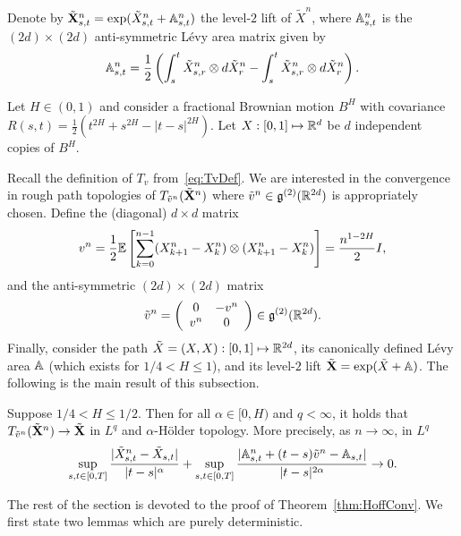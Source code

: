 \documentclass{article}
\begin{document}
Denote by $\tilde {\mathbf X}^n_{s,t} = \exp(\tilde X^n_{s,t} + \mathbb A^n_{s,t})$ the level-$2$ lift of $\tilde X^n$, where $\mathbb A^n_{s,t}$ is the $(2d) \times (2d)$ anti-symmetric L{\'e}vy area matrix given by
\[
\mathbb A^n_{s,t}
= \frac{1}{2}\left(\int_s^t \tilde X^n_{s,r} \otimes d\tilde X^n_r - \int_s^t \tilde X^n_{s,r} \otimes d\tilde X^n_r\right).
\]


Let $H \in (0,1)$ and consider a fractional Brownian motion $B^H$ with covariance $R(s,t) = \frac{1}{2}(t^{2H} + s^{2H} - |t-s|^{2H})$. Let $X : [0,1] \mapsto \mathbb R^d$ be $d$ independent copies of $B^H$.

Recall the definition of $T_v$ from~\eqref{eq:TvDef}. We are interested in the convergence in rough path topologies of $T_{\tilde v^n}(\tilde {\mathbf X}^n)$ where $\tilde v^n \in \mathfrak g^{(2)}(\mathbb R^{2d})$ is appropriately chosen. Define the (diagonal) $d\times d$ matrix
\[
v^n = \frac{1}{2}\mathbb E \left[ \sum_{k=0}^{n-1} (X^n_{k+1}-X^n_k) \otimes (X^n_{k+1}-X^n_k) \right] = \frac{n^{1-2H}}{2} I,
\]
and the anti-symmetric $(2d) \times (2d)$ matrix
\[
\tilde v^n = \left( \begin{array}{cc} 0 & -v^n  \\ v^n  & 0 \end{array} \right) \in \mathfrak g^{(2)}(\mathbb R^{2d}).
\]
Finally, consider the path $\tilde X = (X,X) : [0,1] \mapsto \mathbb R^{2d}$, its canonically defined L{\'e}vy area $\mathbb A$ (which exists for $1/4 < H \leq 1$), and its level-$2$ lift $\tilde {\mathbf X} = \exp(\tilde X + \mathbb A)$. The following is the main result of this subsection.

\begin{theorem}\label{thm:HoffConv}
Suppose $1/4 < H \leq 1/2$. Then for all $\alpha \in [0, H)$ and $q < \infty$, it holds that $T_{\tilde v^n}(\tilde {\mathbf X}^n) \rightarrow \tilde {\mathbf X}$ in $L^q$ and $\alpha$-H{\"o}lder topology. More precisely, as $n \rightarrow \infty$, in $L^q$
\[
\sup_{s,t \in [0,T]} \frac{|\tilde X^n_{s,t} - \tilde X_{s,t}|}{|t-s|^\alpha} + \sup_{s,t \in [0,T]} \frac{|\Abb^n_{s,t} + (t-s)\tilde v^n - \Abb_{s,t}|}{|t-s|^{2\alpha}} \rightarrow 0.
\]
\end{theorem}

The rest of the section is devoted to the proof of Theorem~\ref{thm:HoffConv}. We first state two lemmas which are purely deterministic.
\end{document}
